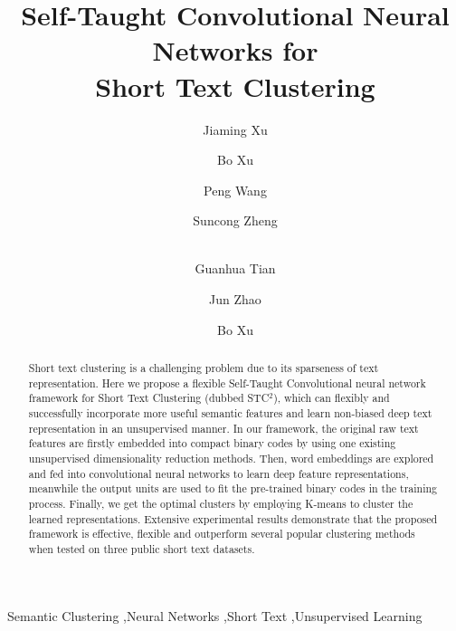 \documentclass[review]{elsarticle}
\begin{document}
\begin{frontmatter}

\title{Self-Taught Convolutional Neural Networks for\\Short Text Clustering}


\author[mymainaddress]{Jiaming Xu}
\author[mymainaddress]{Bo Xu}
\author[mymainaddress]{Peng Wang}
\author[mymainaddress]{Suncong Zheng}
\author[mymainaddress]{\\Guanhua Tian}
\author[mymainaddress,mysecondaryaddress]{Jun Zhao}

\author[mymainaddress,brainaddress]{Bo Xu}

\address[mymainaddress]{Institute of Automation, Chinese Academy of Sciences (CAS), Beijing, P.R. China}
\address[mysecondaryaddress]{National Laboratory of Pattern Recognition (NLPR), Beijing, P.R. China}
\address[brainaddress]{Center for Excellence in Brain Science and Intelligence Technology, CAS. P.R. China}


\begin{abstract}
  Short text clustering is a challenging problem due to its sparseness of text representation. Here we propose a flexible Self-Taught Convolutional neural network framework for Short Text Clustering (dubbed STC$^2$), which can flexibly and successfully incorporate more useful semantic features and learn non-biased deep text representation in an unsupervised manner. In our framework, the original raw text features are firstly embedded into compact binary codes by using one existing unsupervised dimensionality reduction methods. Then, word embeddings are explored and fed into convolutional neural networks to learn deep feature representations, meanwhile the output units are used to fit the pre-trained binary codes in the training process. Finally, we get the optimal clusters by employing K-means to cluster the learned representations. Extensive experimental results demonstrate that the proposed framework is effective, flexible and outperform several popular clustering methods when tested on three public short text datasets.
\end{abstract}

\begin{keyword}
Semantic Clustering \sep Neural Networks \sep Short Text \sep Unsupervised Learning
\end{keyword}

\end{frontmatter}
\end{document}
